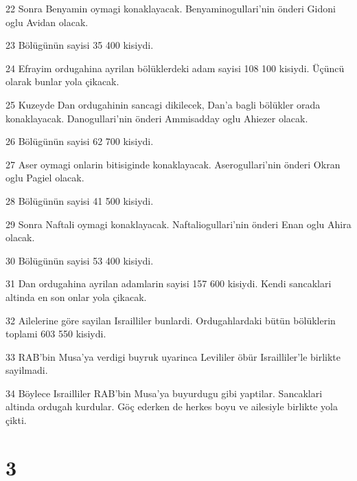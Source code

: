 \par 22 Sonra Benyamin oymagi konaklayacak. Benyaminogullari'nin önderi Gidoni oglu Avidan olacak.
\par 23 Bölügünün sayisi 35 400 kisiydi.
\par 24 Efrayim ordugahina ayrilan bölüklerdeki adam sayisi 108 100 kisiydi. Üçüncü olarak bunlar yola çikacak.
\par 25 Kuzeyde Dan ordugahinin sancagi dikilecek, Dan'a bagli bölükler orada konaklayacak. Danogullari'nin önderi Ammisadday oglu Ahiezer olacak.
\par 26 Bölügünün sayisi 62 700 kisiydi.
\par 27 Aser oymagi onlarin bitisiginde konaklayacak. Aserogullari'nin önderi Okran oglu Pagiel olacak.
\par 28 Bölügünün sayisi 41 500 kisiydi.
\par 29 Sonra Naftali oymagi konaklayacak. Naftaliogullari'nin önderi Enan oglu Ahira olacak.
\par 30 Bölügünün sayisi 53 400 kisiydi.
\par 31 Dan ordugahina ayrilan adamlarin sayisi 157 600 kisiydi. Kendi sancaklari altinda en son onlar yola çikacak.
\par 32 Ailelerine göre sayilan Israilliler bunlardi. Ordugahlardaki bütün bölüklerin toplami 603 550 kisiydi.
\par 33 RAB'bin Musa'ya verdigi buyruk uyarinca Levililer öbür Israilliler'le birlikte sayilmadi.
\par 34 Böylece Israilliler RAB'bin Musa'ya buyurdugu gibi yaptilar. Sancaklari altinda ordugah kurdular. Göç ederken de herkes boyu ve ailesiyle birlikte yola çikti.

\chapter{3}

